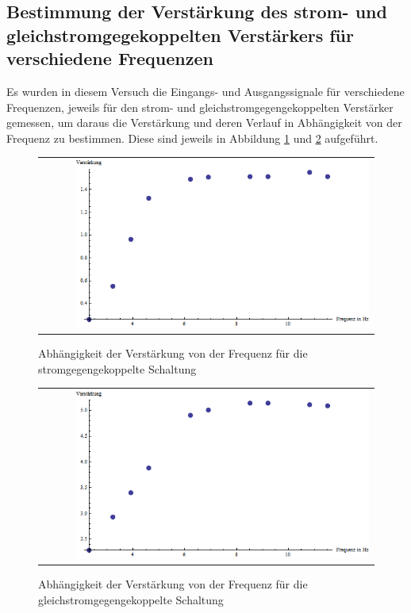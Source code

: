 \documentclass[a4paper,titlepage]{scrartcl}
\numberwithin{equation}{section}
\begin{document}
\subsection{Bestimmung der Verstärkung des strom- und gleichstromgegekoppelten Verstärkers für verschiedene Frequenzen}
Es wurden in diesem Versuch die Eingangs- und Ausgangssignale für verschiedene Frequenzen, jeweils für den strom- und gleichstromgegengekoppelten Verstärker gemessen, um daraus die Verstärkung und deren Verlauf in Abhängigkeit von der Frequenz zu bestimmen. Diese sind jeweils in Abbildung \ref{fig:aufgabe14a} und \ref{fig:aufgabe14b} aufgeführt.
\begin{figure}[H]
	\centering
	\begin{tabular}{@{}r@{}}
		\includegraphics[width=0.9\textwidth]{bilder/aufgabe14-stromgegengekoppelt.png}\\
	\end{tabular}
	\caption{Abhängigkeit der Verstärkung von der Frequenz für die stromgegengekoppelte Schaltung}
	\label{fig:aufgabe14a}
\end{figure}
\begin{figure}[H]
	\centering
	\begin{tabular}{@{}r@{}}
		\includegraphics[width=0.9\textwidth]{bilder/aufgabe14-gleichstromgegengekoppelt.png}\\
	\end{tabular}
	\caption{Abhängigkeit der Verstärkung von der Frequenz für die gleichstromgegengekoppelte Schaltung}
	\label{fig:aufgabe14b}
\end{figure}
\end{document}
